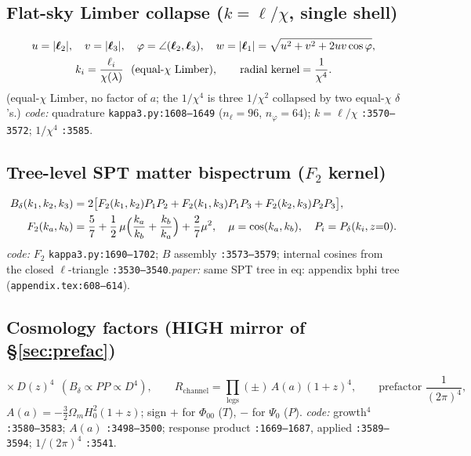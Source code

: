 \documentclass[11pt]{article}
\newcommand{\code}[1]{\texttt{\footnotesize #1}}
\newcommand{\eq}[1]{\textsf{#1}}                 %
\newcommand{\chh}{\chi}
\newcommand{\lam}{\lambda}
\newcommand{\Phizero}{\Phi_{00}}
\newcommand{\Psizero}{\Psi_{0}}
\newcommand{\Dgrow}{D}
\begin{document}
\subsection{Flat-sky Limber collapse ($k=\ell/\chh$, single shell)}
\begin{gather}
u=|\boldsymbol\ell_2|,\quad v=|\boldsymbol\ell_3|,\quad \varphi=\angle(\boldsymbol\ell_2,\boldsymbol\ell_3),\quad
w=|\boldsymbol\ell_1|=\sqrt{u^2+v^2+2uv\cos\varphi},\notag\\
k_i=\frac{\ell_i}{\chh(\lam)}\ \ (\text{equal-}\chh\ \text{Limber}),\qquad \text{radial kernel}=\frac{1}{\chh^4}.
\end{gather}
(equal-$\chh$ Limber, no factor of $a$; the $1/\chh^4$ is three $1/\chh^2$ collapsed by two
equal-$\chh$ $\delta$'s.) \textit{code:} quadrature \code{kappa3.py:1608--1649}
($n_\ell{=}96$, $n_\varphi{=}64$); $k=\ell/\chh$ \code{:3570--3572}; $1/\chh^4$ \code{:3585}.

\subsection{Tree-level SPT matter bispectrum ($F_2$ kernel)}
\begin{align}
B_\delta(k_1,k_2,k_3)&=2\bigl[F_2(k_1,k_2)P_1P_2+F_2(k_1,k_3)P_1P_3+F_2(k_2,k_3)P_2P_3\bigr],\\
F_2(k_a,k_b)&=\frac57+\frac12\,\mu\Bigl(\frac{k_a}{k_b}+\frac{k_b}{k_a}\Bigr)+\frac27\mu^2,
   \quad \mu=\cos(k_a,k_b),\quad P_i=P_\delta(k_i,z{=}0).
\end{align}
\textit{code:} $F_2$ \code{kappa3.py:1690--1702}; $B$ assembly \code{:3573--3579}; internal
cosines from the closed $\ell$-triangle \code{:3530--3540}.\quad \textit{paper:} same SPT tree
in \eq{eq: appendix bphi tree} (\code{appendix.tex:608--614}).

\subsection{Cosmology factors (HIGH mirror of \S\ref{sec:prefac})}
\begin{equation}
\times\,\Dgrow(z)^4\ \ (B_\delta\propto PP\propto \Dgrow^4),\qquad
R_{\mathrm{channel}}=\prod_{\mathrm{legs}}(\pm)\,A(a)(1{+}z)^4,\qquad
\text{prefactor }\frac{1}{(2\pi)^4},
\end{equation}
$A(a)=-\tfrac32\Omega_m H_0^2(1{+}z)$; sign $+$ for $\Phizero$ ($T$), $-$ for $\Psizero$ ($P$).
\textit{code:} growth$^4$ \code{:3580--3583}; $A(a)$ \code{:3498--3500}; response product
\code{:1669--1687}, applied \code{:3589--3594}; $1/(2\pi)^4$ \code{:3541}.
\end{document}

